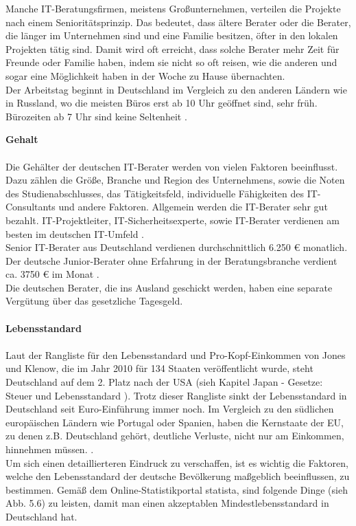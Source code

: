 	Manche IT-Beratungsfirmen, meistens Großunternehmen, verteilen die Projekte nach einem Senioritätsprinzip. Das bedeutet, dass ältere Berater oder die Berater, die länger im Unternehmen sind und eine Familie besitzen, öfter in den lokalen Projekten tätig sind. Damit wird oft erreicht, dass solche Berater mehr Zeit für Freunde oder Familie haben, indem sie nicht so oft reisen, wie die anderen und sogar eine Möglichkeit haben in der Woche zu Hause übernachten.\\
	Der Arbeitstag beginnt in Deutschland im Vergleich zu den anderen Ländern wie in Russland, wo die meisten Büros erst ab 10 Uhr geöffnet sind, sehr früh. Bürozeiten ab 7 Uhr sind keine Seltenheit \cite{ArbKulturDE}. %
	
	\textbf{Gehalt} \\ \\
	Die Gehälter der deutschen IT-Berater werden von vielen Faktoren beeinflusst. Dazu zählen die Größe, Branche und Region des Unternehmens, sowie die Noten des Studienabschlusses, das Tätigkeitsfeld, individuelle Fähigkeiten des IT-Consultants und andere Faktoren. Allgemein werden die IT-Berater sehr gut bezahlt. IT-Projektleiter, IT-Sicherheitsexperte, sowie IT-Berater verdienen am besten im deutschen IT-Umfeld \cite{VerdienstITinDE}.\\
	Senior IT-Berater aus Deutschland verdienen durchschnittlich 6.250 € monatlich. Der deutsche Junior-Berater ohne Erfahrung in der Beratungsbranche verdient ca. 3750 € im Monat .\cite{GehaltSAPBerDE} \\
	Die deutschen Berater, die ins Ausland geschickt werden, haben eine separate Vergütung über das gesetzliche Tagesgeld. \\ \\

	\textbf{Lebensstandard} \\ \\
	Laut der Rangliste für den Lebensstandard und Pro-Kopf-Einkommen von Jones und Klenow, die im Jahr 2010 für 134 Staaten veröffentlicht wurde, steht Deutschland auf dem 2. Platz nach der USA (sieh Kapitel Japan - Gesetze: Steuer und Lebensstandard \label{LebStdProKEink}). Trotz dieser Rangliste sinkt der Lebensstandard in Deutschland seit Euro-Einführung immer noch. Im Vergleich zu den südlichen europäischen Ländern wie Portugal oder Spanien, haben die Kernstaate der EU, zu denen z.B. Deutschland gehört, deutliche Verluste, nicht nur am Einkommen, hinnehmen müssen. \cite{SteigungDELebstd}.\\
	Um sich einen detaillierteren Eindruck zu verschaffen, ist es wichtig die Faktoren, welche den Lebensstandard  der deutsche Bevölkerung maßgeblich beeinflussen, zu bestimmen. Gemäß dem Online-Statistikportal statista, sind folgende Dinge (sieh Abb. 5.6) zu leisten, damit man einen akzeptablen Mindestlebensstandard in Deutschland hat.

